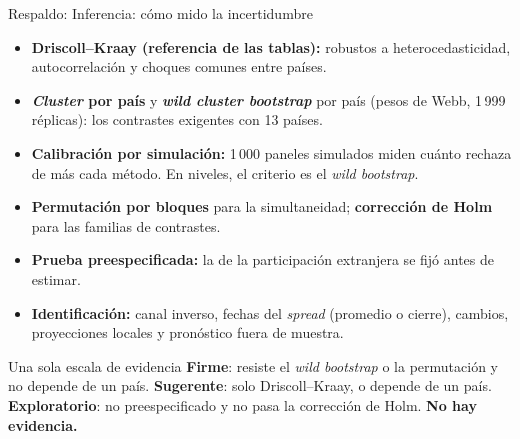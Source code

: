 \documentclass[aspectratio=169]{beamer}
\begin{document}
\begin{frame}{Respaldo: Inferencia: cómo mido la incertidumbre}
\footnotesize
\begin{itemize}\setlength\itemsep{1pt}
\item \textbf{Driscoll--Kraay (referencia de las tablas):} robustos a heterocedasticidad, autocorrelación y choques comunes entre países.
\item \textbf{\textit{Cluster} por país} y \textbf{\textit{wild cluster bootstrap}} por país (pesos de Webb, 1\,999 réplicas): los contrastes exigentes con 13 países.
\item \textbf{Calibración por simulación:} 1\,000 paneles simulados miden cuánto rechaza de más cada método. En niveles, el criterio es el \textit{wild bootstrap}.
\item \textbf{Permutación por bloques} para la simultaneidad; \textbf{corrección de Holm} para las familias de contrastes.
\item \textbf{Prueba preespecificada:} la de la participación extranjera se fijó antes de estimar.
\item \textbf{Identificación:} canal inverso, fechas del \textit{spread} (promedio o cierre), cambios, proyecciones locales y pronóstico fuera de muestra.
\end{itemize}
\vspace{-7pt}
\begin{exampleblock}{Una sola escala de evidencia}
\footnotesize \textbf{Firme}: resiste el \textit{wild bootstrap} o la permutación y no depende de un país. \textbf{Sugerente}: solo Driscoll--Kraay, o depende de un país. \textbf{Exploratorio}: no preespecificado y no pasa la corrección de Holm. \textbf{No hay evidencia.}
\end{exampleblock}
\end{frame}
\end{document}
